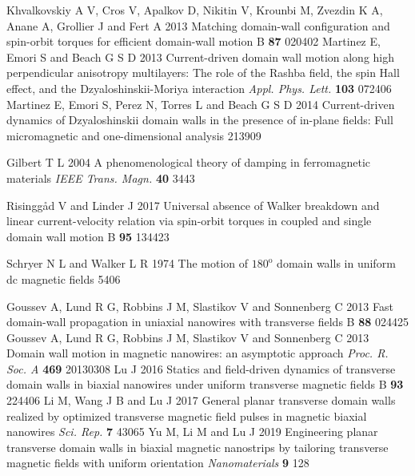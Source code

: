 \documentclass[12pt]{iopart}
\begin{document}
\begin{thebibliography}{99}
 Khvalkovskiy A V, Cros V, Apalkov D, Nikitin V, Krounbi M, Zvezdin K A, Anane A, Grollier J and Fert A 2013 Matching domain-wall configuration and spin-orbit torques for efficient domain-wall motion \PR B {\bf 87} 020402
 Martinez E, Emori S and Beach G S D 2013 Current-driven domain wall motion along high perpendicular anisotropy multilayers: The role of the Rashba field, the spin Hall effect, and the Dzyaloshinskii-Moriya interaction {\it Appl. Phys. Lett.} {\bf 103} 072406
 Martinez E, Emori S, Perez N, Torres L and Beach G S D 2014 Current-driven dynamics of Dzyaloshinskii domain walls in the presence of in-plane fields: Full micromagnetic and one-dimensional analysis  213909


 Gilbert T L 2004 A phenomenological theory of damping in ferromagnetic materials {\it IEEE Trans. Magn.} {\bf 40} 3443

 Risingg{\aa}d V and Linder J 2017 Universal absence of Walker breakdown and linear current-velocity relation via spin-orbit torques in coupled and single domain wall motion \PR B {\bf 95} 134423


 Schryer N L and Walker L R 1974 The motion of $180^{\mathrm{o}}$ domain walls in uniform dc magnetic fields  5406

 Goussev A, Lund R G, Robbins J M, Slastikov V and Sonnenberg C 2013 Fast domain-wall propagation in uniaxial nanowires with transverse fields \PR B {\bf 88} 024425
 Goussev A, Lund R G, Robbins J M, Slastikov V and Sonnenberg C 2013 Domain wall motion in magnetic nanowires: an asymptotic approach {\it Proc. R. Soc. A} {\bf 469} 20130308
 Lu J 2016 Statics and field-driven dynamics of transverse domain walls in biaxial nanowires under uniform transverse magnetic fields \PR B {\bf 93} 224406
 Li M, Wang J B and Lu J 2017 General planar transverse domain walls realized by optimized transverse magnetic field pulses in magnetic biaxial nanowires {\it Sci. Rep.} {\bf 7} 43065
 Yu M, Li M and Lu J 2019 Engineering planar transverse domain walls in biaxial magnetic nanostrips by tailoring transverse magnetic fields with uniform orientation {\it Nanomaterials} {\bf 9} 128



\end{thebibliography}
\end{document}
